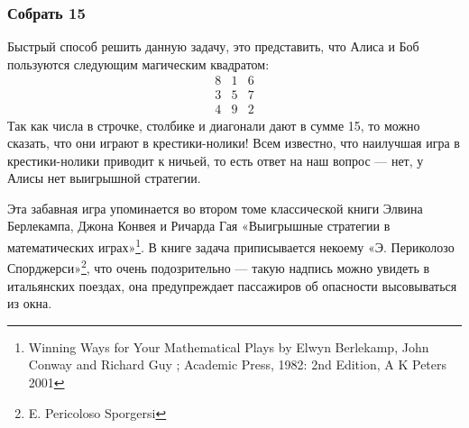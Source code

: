 

\subsubsection*{Собрать 15} %



Быстрый способ решить данную задачу,  это представить, что Алиса и Боб пользуются следующим магическим квадратом:
$$
\begin{matrix}
8&1&6\\
3&5&7\\
4&9&2
\end{matrix}
$$
Так как числа в строчке, столбике и диагонали дают в сумме 15, то можно сказать, что они играют в крестики-нолики!  
Всем известно, что наилучшая игра в крестики-нолики приводит к ничьей,
то есть ответ на наш вопрос --- нет, у Алисы нет выигрышной стратегии.
\heart


Эта забавная игра упоминается во втором томе классической книги Элвина Берлекампа,  Джона Конвея и Ричарда Гая  «Выигрышные стратегии в математических играх»\footnote{Winning Ways for Your Mathematical Plays  by Elwyn Berlekamp, John Conway and Richard Guy ;   Academic Press, 1982: 2nd Edition, A K Peters 2001}. В книге  задача приписывается некоему «Э. Периколозо Спорджерси»\footnote{E. Pericoloso Sporgersi}, что очень подозрительно ---
такую надпись
можно увидеть в итальянских поездах, она предупреждает пассажиров об опасности высовываться из окна.